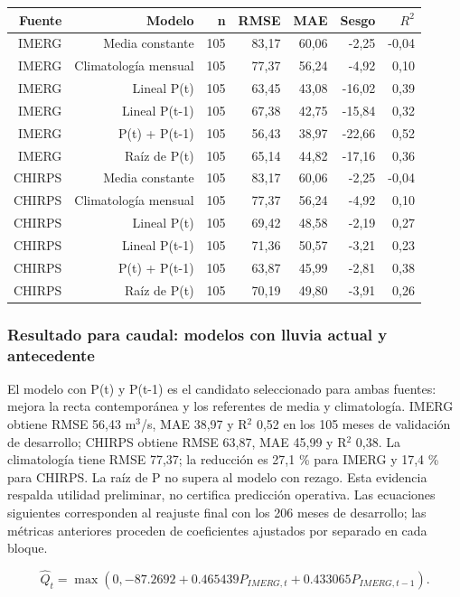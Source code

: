\documentclass[10pt,a4paper]{article}
\begin{document}
\begin{center}\small\begin{tabular}{rrrrrrr}\hline
Fuente & Modelo & n & RMSE & MAE & Sesgo & $R^2$ \\ \hline
IMERG & Media constante & 105 & 83,17 & 60,06 & -2,25 & -0,04 \\
IMERG & Climatología mensual & 105 & 77,37 & 56,24 & -4,92 & 0,10 \\
IMERG & Lineal P(t) & 105 & 63,45 & 43,08 & -16,02 & 0,39 \\
IMERG & Lineal P(t-1) & 105 & 67,38 & 42,75 & -15,84 & 0,32 \\
IMERG & P(t) + P(t-1) & 105 & 56,43 & 38,97 & -22,66 & 0,52 \\
IMERG & Raíz de P(t) & 105 & 65,14 & 44,82 & -17,16 & 0,36 \\
CHIRPS & Media constante & 105 & 83,17 & 60,06 & -2,25 & -0,04 \\
CHIRPS & Climatología mensual & 105 & 77,37 & 56,24 & -4,92 & 0,10 \\
CHIRPS & Lineal P(t) & 105 & 69,42 & 48,58 & -2,19 & 0,27 \\
CHIRPS & Lineal P(t-1) & 105 & 71,36 & 50,57 & -3,21 & 0,23 \\
CHIRPS & P(t) + P(t-1) & 105 & 63,87 & 45,99 & -2,81 & 0,38 \\
CHIRPS & Raíz de P(t) & 105 & 70,19 & 49,80 & -3,91 & 0,26 \\
\hline\end{tabular}\end{center}
\subsubsection*{Resultado para caudal: modelos con lluvia actual y antecedente}
El modelo con P(t) y P(t-1) es el candidato seleccionado para ambas fuentes: mejora la recta contemporánea y los referentes de media y climatología. IMERG obtiene RMSE 56,43 m$^3$/s, MAE 38,97 y R$^2$ 0,52 en los 105 meses de validación de desarrollo; CHIRPS obtiene RMSE 63,87, MAE 45,99 y R$^2$ 0,38. La climatología tiene RMSE 77,37; la reducción es 27,1 \% para IMERG y 17,4 \% para CHIRPS. La raíz de P no supera al modelo con rezago. Esta evidencia respalda utilidad preliminar, no certifica predicción operativa. Las ecuaciones siguientes corresponden al reajuste final con los 206 meses de desarrollo; las métricas anteriores proceden de coeficientes ajustados por separado en cada bloque.

\begin{equation}
\widehat{Q}_t=\max\left(0,-87.2692+0.465439P_{IMERG,t}+0.433065P_{IMERG,t-1}\right).
\end{equation}
\end{document}
